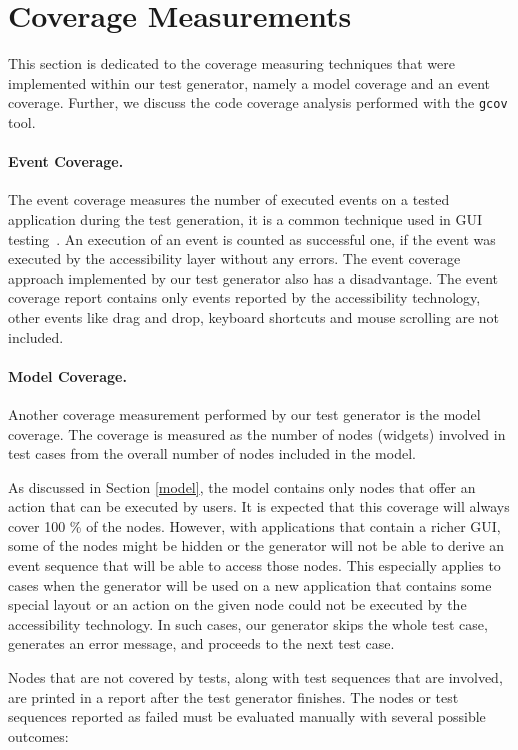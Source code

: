 \section{Coverage Measurements}\label{coverage}
This section is dedicated to the coverage measuring techniques that were implemented within our test generator, namely a model coverage and an event coverage. Further, we discuss the code coverage analysis performed with the \verb|gcov| tool.

\paragraph{Event Coverage.} The event coverage measures the number of executed events on a tested application during the test generation, it is a common technique used in GUI testing~\cite{NguyenBao2014Gait}. An execution of an event is counted as successful one, if the event was executed by the accessibility layer without any errors. The event coverage approach implemented by our test generator also has a disadvantage. The event coverage report contains only events reported by the accessibility technology, other events like drag and drop, keyboard shortcuts and mouse scrolling are not included.

\paragraph{Model Coverage.} Another coverage measurement performed by our test generator is the model coverage. The coverage is measured as the number of nodes (widgets) involved in test cases from the overall number of nodes included in the model.

As discussed in Section \ref{model}, the model contains only nodes that offer an action that can be executed by users. It is expected that this coverage will always cover 100 \% of the nodes. However, with applications that contain a richer GUI, some of the nodes might be hidden or the generator will not be able to derive an event sequence that will be able to access those nodes. This especially applies to cases when the generator will be used on a new application that contains some special layout or an action on the given node could not be executed by the accessibility technology. In such cases, our generator skips the whole test case, generates an error message, and proceeds to the next test case. 

Nodes that are not covered by tests, along with test sequences that are involved, are printed in a report after the test generator finishes. The nodes or test sequences reported as failed must be evaluated manually with several possible outcomes:

